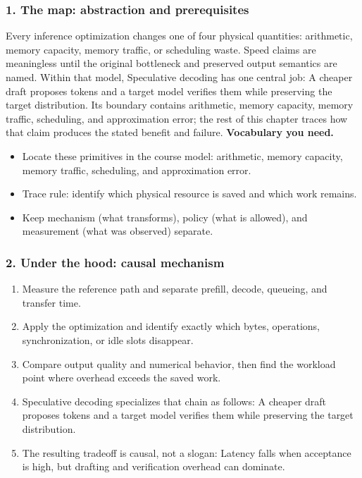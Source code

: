 \subsubsection*{1. The map: abstraction and prerequisites}
Every inference optimization changes one of four physical quantities: arithmetic, memory capacity, memory traffic, or scheduling waste. Speed claims are meaningless until the original bottleneck and preserved output semantics are named.
Within that model, Speculative decoding has one central job: A cheaper draft proposes tokens and a target model verifies them while preserving the target distribution. Its boundary contains arithmetic, memory capacity, memory traffic, scheduling, and approximation error; the rest of this chapter traces how that claim produces the stated benefit and failure.
\textbf{Vocabulary you need.}\begin{itemize}
\item Locate these primitives in the course model: arithmetic, memory capacity, memory traffic, scheduling, and approximation error.
\item Trace rule: identify which physical resource is saved and which work remains.
\item Keep mechanism (what transforms), policy (what is allowed), and measurement (what was observed) separate.
\end{itemize}
\subsubsection*{2. Under the hood: causal mechanism}\begin{enumerate}
\item Measure the reference path and separate prefill, decode, queueing, and transfer time.
\item Apply the optimization and identify exactly which bytes, operations, synchronization, or idle slots disappear.
\item Compare output quality and numerical behavior, then find the workload point where overhead exceeds the saved work.
\item Speculative decoding specializes that chain as follows: A cheaper draft proposes tokens and a target model verifies them while preserving the target distribution.
\item The resulting tradeoff is causal, not a slogan: Latency falls when acceptance is high, but drafting and verification overhead can dominate.
\end{enumerate}

